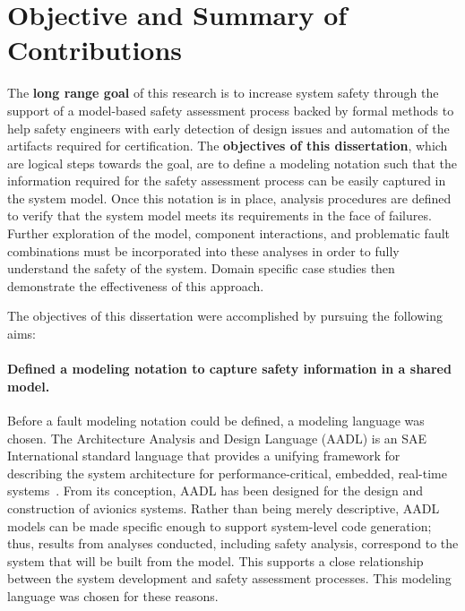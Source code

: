 

\section{Objective and Summary of Contributions}
The \textbf{long range goal} of this research is to increase system safety through the support of a model-based safety assessment process backed by formal methods to help safety engineers with early detection of design issues and automation of the artifacts required for certification. The \textbf{objectives of this dissertation}, which are logical steps towards the goal, are to define a modeling notation such that the information required for the safety assessment process can be easily captured in the system model. Once this notation is in place, analysis procedures are defined to verify that the system model meets its requirements in the face of failures. Further exploration of the model, component interactions, and problematic fault combinations must be incorporated into these analyses in order to fully understand the safety of the system. Domain specific case studies then demonstrate the effectiveness of this approach.

The objectives of this dissertation were accomplished by pursuing the following aims: 

\paragraph{Defined a modeling notation to capture safety information in a shared model.}
Before a fault modeling notation could be defined, a modeling language was chosen. The Architecture Analysis and Design Language (AADL) is an SAE International standard language that provides a unifying framework for describing the system architecture for performance-critical, embedded, real-time systems~\cite{AADL_Standard,FeilerModelBasedEngineering2012}. From its conception, AADL has been designed for the design and construction of avionics systems.  Rather than being merely descriptive, AADL models can be made specific enough to support system-level code generation; thus, results from analyses conducted, including safety analysis, correspond to the system that will be built from the model.  This supports a close relationship between the system development and safety assessment processes. This modeling language was chosen for these reasons. 

